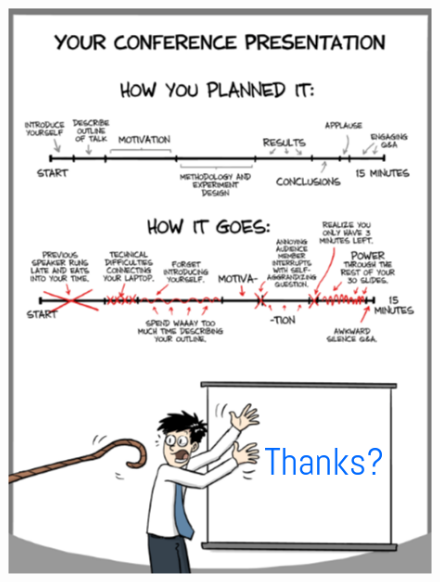 \documentclass[a4paper,10pt]{beamer}
\begin{document}
\begin{frame}
 \begin{figure}
  \center 
  \includegraphics[scale=0.4]{fig50}
 \end{figure}
\end{frame}
\end{document}
